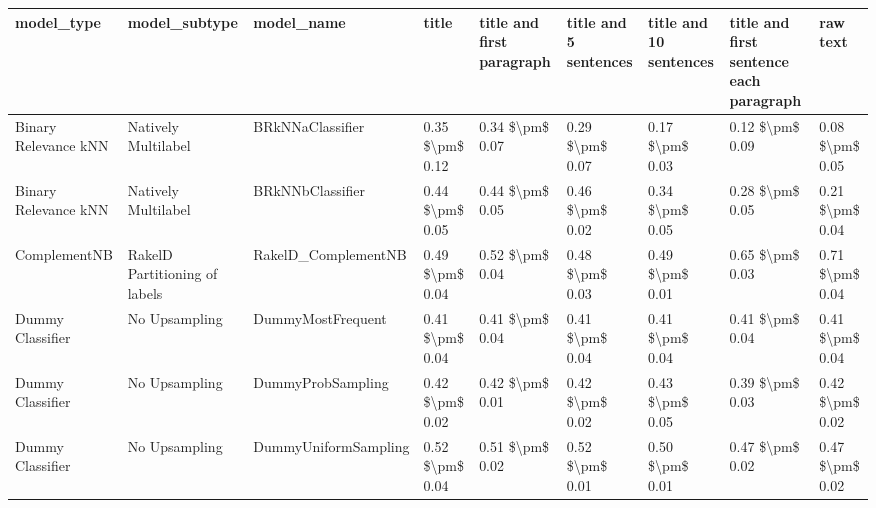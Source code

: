 \begin{tabular}{lllllllll}
\toprule
                     model\_type &                 model\_subtype &                                   model\_name &           title & title and first paragraph & title and 5 sentences & title and 10 sentences & title and first sentence each paragraph &            raw text \\
\midrule
           Binary Relevance kNN &           Natively Multilabel &                             BRkNNaClassifier & 0.35 \$\textbackslash pm\$ 0.12 &           0.34 \$\textbackslash pm\$ 0.07 &       0.29 \$\textbackslash pm\$ 0.07 &        0.17 \$\textbackslash pm\$ 0.03 &                         0.12 \$\textbackslash pm\$ 0.09 &     0.08 \$\textbackslash pm\$ 0.05 \\
           Binary Relevance kNN &           Natively Multilabel &                             BRkNNbClassifier & 0.44 \$\textbackslash pm\$ 0.05 &           0.44 \$\textbackslash pm\$ 0.05 &       0.46 \$\textbackslash pm\$ 0.02 &        0.34 \$\textbackslash pm\$ 0.05 &                         0.28 \$\textbackslash pm\$ 0.05 &     0.21 \$\textbackslash pm\$ 0.04 \\
                   ComplementNB & RakelD Partitioning of labels &                          RakelD\_ComplementNB & 0.49 \$\textbackslash pm\$ 0.04 &           0.52 \$\textbackslash pm\$ 0.04 &       0.48 \$\textbackslash pm\$ 0.03 &        0.49 \$\textbackslash pm\$ 0.01 &                         0.65 \$\textbackslash pm\$ 0.03 &     0.71 \$\textbackslash pm\$ 0.04 \\
               Dummy Classifier &                 No Upsampling &                            DummyMostFrequent & 0.41 \$\textbackslash pm\$ 0.04 &           0.41 \$\textbackslash pm\$ 0.04 &       0.41 \$\textbackslash pm\$ 0.04 &        0.41 \$\textbackslash pm\$ 0.04 &                         0.41 \$\textbackslash pm\$ 0.04 &     0.41 \$\textbackslash pm\$ 0.04 \\
               Dummy Classifier &                 No Upsampling &                            DummyProbSampling & 0.42 \$\textbackslash pm\$ 0.02 &           0.42 \$\textbackslash pm\$ 0.01 &       0.42 \$\textbackslash pm\$ 0.02 &        0.43 \$\textbackslash pm\$ 0.05 &                         0.39 \$\textbackslash pm\$ 0.03 &     0.42 \$\textbackslash pm\$ 0.02 \\
               Dummy Classifier &                 No Upsampling &                         DummyUniformSampling & 0.52 \$\textbackslash pm\$ 0.04 &           0.51 \$\textbackslash pm\$ 0.02 &       0.52 \$\textbackslash pm\$ 0.01 &        0.50 \$\textbackslash pm\$ 0.01 &                         0.47 \$\textbackslash pm\$ 0.02 &     0.47 \$\textbackslash pm\$ 0.02 \\

\end{tabular}
